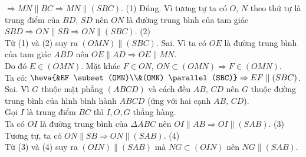 \begin{ex}
{\begin{itemchoice}
   $\Rightarrow MN \parallel BC  \Rightarrow MN \parallel (SBC)$. (1)
   \itemch Đúng. Vì tương tự ta có $O,\,N$ theo thứ tự là trung điểm của $BD,\,SD$ nên $ON$  là đường trung bình của tam giác $SBD \Rightarrow ON \parallel SB \Rightarrow ON \parallel (SBC)$. (2)\\
   Từ (1) và (2) suy ra  $(OMN) \parallel (SBC)$.
   \itemch Sai. Vì ta có $OE$ là đường trung bình của tam giác $ABD$  nên $OE \parallel AD \Rightarrow OE \parallel MN$.\\
   Do đó $E \in (OMN)$. Mặt khác $F \in ON$, $ON \subset (OMN) \Rightarrow F \in  (OMN)$.\\
   Ta có: $\heva{&EF \subset (OMN)\\&(OMN) \parallel (SBC)} \Rightarrow  EF \parallel (SBC)$.
   \itemch Sai. Vì $G$ thuộc mặt phẳng $(ABCD)$ và cách đều $AB,\,CD$ nên $G$ thuộc đường trung bình của hình bình hành  $ABCD$ (ứng với hai cạnh $AB,\,CD$).\\
   Gọi $I$ là trung điểm $BC$  thì $I,O,G$ thẳng hàng.\\
   Ta có $OI$ là đường trung bình của $\Delta  ABC$ nên $OI \parallel AB \Rightarrow OI \parallel (SAB)$. (3)\\
    Tương tự, ta có $ON \parallel SB \Rightarrow ON \parallel (SAB)$. (4)\\
   Từ (3) và (4) suy ra $(OIN) \parallel (SAB)$  mà $NG \subset (OIN)$ nên $NG \parallel (SAB)$.
  \end{itemchoice}
 } 
\end{ex}

